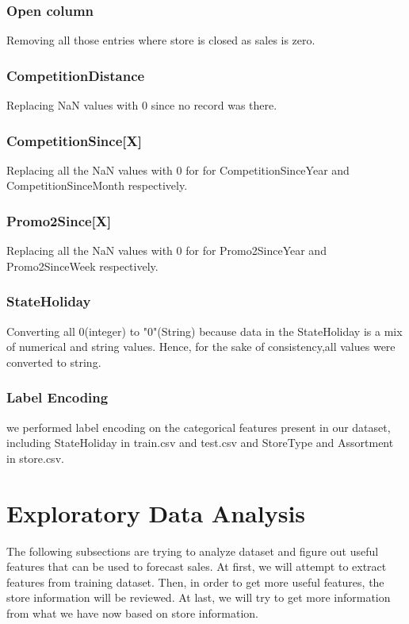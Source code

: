 \documentclass[letterpaper, 10 pt, conference]{ieeeconf}  %
\begin{document}
\subsubsection{\textbf{Open column}}

Removing all those entries where store is closed as sales is zero.
\bigskip
\subsubsection{\textbf{CompetitionDistance}}

Replacing NaN values with 0 since no record was there.
\bigskip
\subsubsection{\textbf{CompetitionSince[X]}}

Replacing all the NaN values with 0 for for CompetitionSinceYear and CompetitionSinceMonth
respectively.

\bigskip
\subsubsection{\textbf{Promo2Since[X]}}

Replacing all the NaN values with 0 for for Promo2SinceYear and Promo2SinceWeek respectively.

\bigskip
\subsubsection{\textbf{StateHoliday}}
Converting all 0(integer) to "0"(String) because data in the StateHoliday is a mix of numerical and string values. Hence, for the sake of consistency,all values were converted to string.

\bigskip
\subsubsection{\textbf{Label Encoding}}

we performed label encoding on the categorical features present in our dataset, including StateHoliday in train.csv and test.csv and  StoreType  and Assortment  in store.csv.

\bigskip
\section{Exploratory Data Analysis}

The  following  subsections  are  trying  to  analyze  dataset and  figure  out  useful  features  that  can  be  used  to  forecast sales. At first, we will attempt to extract features from training dataset. Then, in order to get more useful features, the store information will be reviewed. At last,  we will try to get more information from what we have now based on store
information.
\end{document}
